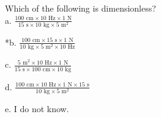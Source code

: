 
Which of the following is dimensionless?\\

a. \(\frac{100\text{ cm} \times 10\text{ Hz} \times 1\text{ N}}{15\text{ s} \times 10\text{ kg} \times 5\text{ m}^{2}}\)

*b.
\(\frac{100\text{ cm} \times 15\text{ s} \times 1\text{ N}}{10\text{ kg} \times 5\text{ m}^{2} \times 10\text{ Hz}}\)

c. \(\frac{5\text{ m}^{2} \times 10\text{ Hz} \times 1\text{ N}}{15\text{ s} \times 100\text{ cm} \times 10\text{ kg}}\)

d. \(\frac{100\text{ cm} \times 10\text{ Hz} \times 1\text{ N} \times 15\text{ s}}{10\text{ kg} \times 5\text{ m}^{2}}\)

e. I do not know.\\
